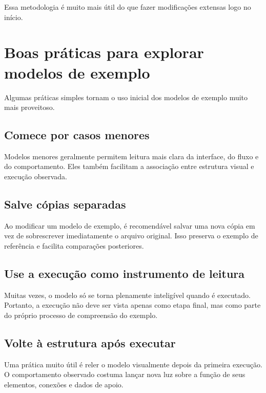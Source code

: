 Essa metodologia é muito mais útil do que fazer modificações extensas logo no início.

\section{Boas práticas para explorar modelos de exemplo}
\label{sec:cap4_boas_praticas_explorar_modelos}

Algumas práticas simples tornam o uso inicial dos modelos de exemplo muito mais proveitoso.

\subsection{Comece por casos menores}
\label{subsec:cap4_comece_por_casos_menores}

Modelos menores geralmente permitem leitura mais clara da interface, do fluxo e do comportamento. Eles também facilitam a associação entre estrutura visual e execução observada.

\subsection{Salve cópias separadas}
\label{subsec:cap4_salve_copias_separadas}

Ao modificar um modelo de exemplo, é recomendável salvar uma nova cópia em vez de sobrescrever imediatamente o arquivo original. Isso preserva o exemplo de referência e facilita comparações posteriores.

\subsection{Use a execução como instrumento de leitura}
\label{subsec:cap4_execucao_como_leitura}

Muitas vezes, o modelo só se torna plenamente inteligível quando é executado. Portanto, a execução não deve ser vista apenas como etapa final, mas como parte do próprio processo de compreensão do exemplo.

\subsection{Volte à estrutura após executar}
\label{subsec:cap4_volte_a_estrutura_apos_executar}

Uma prática muito útil é reler o modelo visualmente depois da primeira execução. O comportamento observado costuma lançar nova luz sobre a função de seus elementos, conexões e dados de apoio.

